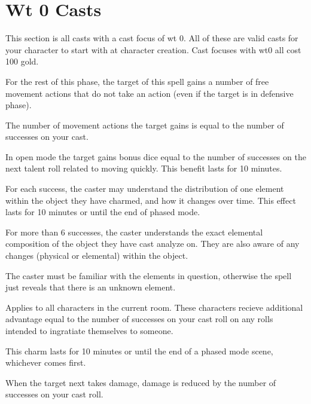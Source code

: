 \section{Wt 0 Casts}

This section is all casts with a cast focus of wt 0. All of these are valid casts for your character to start with at character creation. Cast focuses with wt0 all cost 100 gold.

\begin{GRPtablewide}
	\caption{All Casts with a Wt 0 focus}

	{%
	For the rest of this phase, the target of this spell gains a number of free movement actions that do not take an action (even if the target is in defensive phase).

	The number of movement actions the target gains is equal to the number of successes on your cast.

	In open mode the target gains bonus dice equal to the number of successes on the next talent roll related to moving quickly. This benefit lasts for 10 minutes.
	}

	{%
	For each success, the caster may understand the distribution of one element within the object they have charmed, and how it changes over time. This effect lasts for 10 minutes or until the end of phased mode.

	For more than 6 successes, the caster understands the exact elemental composition of the object they have cast analyze on. They are also aware of any changes (physical or elemental) within the object.

	The caster must be familiar with the elements in question, otherwise the spell just reveals that there is an unknown element.
	}

	{%
	Applies to all characters in the current room. These characters recieve additional advantage equal to the number of successes on your cast roll on any rolls intended to ingratiate themselves to someone.

	This charm lasts for 10 minutes or until the end of a phased mode scene, whichever comes first.
	}

	{%
	When the target next takes damage, damage is reduced by the number of successes on your cast roll.
	}


\end{GRPtablewide}
